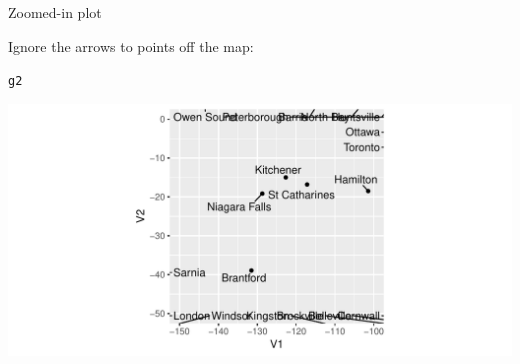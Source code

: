 \documentclass[unknownkeysallowed]{beamer}\usepackage[]{graphicx}\usepackage[]{color}
\makeatletter
\def\maxwidth{ %
  \ifdim\Gin@nat@width>\linewidth
    \linewidth
  \else
    \Gin@nat@width
  \fi
}
\newcommand{\hlstd}[1]{\textcolor[rgb]{0.345,0.345,0.345}{#1}}%
\newenvironment{kframe}{%
 \def\at@end@of@kframe{}%
 \ifinner\ifhmode%
  \def\at@end@of@kframe{\end{minipage}}%
  \begin{minipage}{\columnwidth}%
 \fi\fi%
 \def\FrameCommand##1{\hskip\@totalleftmargin \hskip-\fboxsep
 \colorbox{shadecolor}{##1}\hskip-\fboxsep
     \hskip-\linewidth \hskip-\@totalleftmargin \hskip\columnwidth}%
 \MakeFramed {\advance\hsize-\width
   \@totalleftmargin\z@ \linewidth\hsize
   \@setminipage}}%
 {\par\unskip\endMakeFramed%
 \at@end@of@kframe}
\newenvironment{knitrout}{}{} %
\makeatother
\begin{document}
\begin{frame}[fragile]{Zoomed-in plot}
 
Ignore the arrows to points off the map:


\begin{knitrout}
\color{fgcolor}\begin{kframe}
\begin{alltt}
\hlstd{g2}
\end{alltt}
\end{kframe}
\includegraphics[width=\maxwidth]{figure/spal-1} 

\end{knitrout}

\end{frame}
\end{document}
